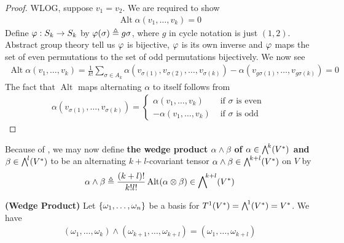 \documentclass{report}
\begin{document}
\begin{proof}
WLOG, suppose $v_1=v_2$.  We are required to show 
\begin{align*}
\operatorname{Alt}\alpha (v_1,\dots,v_k)=0
\end{align*}
Define $\pfi:S_k\rightarrow S_k$ by $\pfi(\sigma)\triangleq g \sigma$, where $g$ in cycle notation is just  $(1,2)$. Abstract group theory tell us $\pfi$ is bijective, $\pfi$ is its own inverse and $\pfi$ maps the set of even permutations to the set of odd permutations bijectively. We now see 
\begin{align*}
\operatorname{Alt}\alpha (v_1,\dots ,v_k)= \frac{1}{k!}\sum_{\sigma \in A_k}\alpha (v_{\sigma (1)},v_{\sigma (2)},\dots ,v_{\sigma (k)}) - \alpha (v_{g\sigma (1)},\dots ,v_{g \sigma(k)})=0 
\end{align*}
The fact that $\operatorname{Alt}$ maps alternating $\alpha $ to itself follows from 
\begin{align*}
\alpha (v_{\sigma (1)},\dots ,v_{\sigma (k)})=\begin{cases}
  \alpha (v_1,\dots, v_k)& \text{ if $\sigma$ is even }\\
  -\alpha (v_1,\dots ,v_k)& \text{ if $\sigma$ is odd }
\end{cases}
\end{align*}
\end{proof}
\begin{mdframed}
Because of , we may now define \textbf{the wedge product $\alpha \wedge  \beta  $ of $\alpha  \in \extp^k(V^*)$ and $\beta \in \extp^l(V^*)$} to be an alternating $k+l$-covariant tensor $\alpha \wedge  \beta  \in \extp^{k+l}(V^*)$ on $V$ by 
\begin{align*}
\alpha \wedge  \beta \triangleq \frac{(k+l)!}{k!l!}\operatorname{Alt}(\alpha \otimes \beta ) \in \extp^{k+l}(V^*) 
\end{align*}
\end{mdframed}
\begin{theorem}
\label{WP}
\textbf{(Wedge Product)} Let $\{ \omega_1,\dots ,\omega_n \}$ be a basis for $T^1(V^*)=\extp^1 (V^*)=V^*$. We have 
\begin{align*}
  (\omega_1 ,\dots ,\omega_k)\wedge  (\omega_{k+1},\dots, \omega_{k+l})=(\omega_1,\dots ,\omega_{k+l}) 
\end{align*}
\end{theorem}
\end{document}
